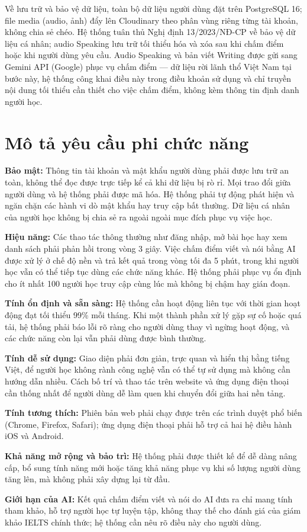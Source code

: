 \begin{sloppypar}
Về lưu trữ và bảo vệ dữ liệu, toàn bộ dữ liệu người dùng đặt trên PostgreSQL 16; file media (audio, ảnh) đẩy lên Cloudinary theo phân vùng riêng từng tài khoản, không chia sẻ chéo. Hệ thống tuân thủ Nghị định 13/2023/NĐ-CP về bảo vệ dữ liệu cá nhân; audio Speaking lưu trữ tối thiểu hóa và xóa sau khi chấm điểm hoặc khi người dùng yêu cầu. Audio Speaking và bản viết Writing được gửi sang Gemini API (Google) phục vụ chấm điểm --- dữ liệu rời lãnh thổ Việt Nam tại bước này, hệ thống công khai điều này trong điều khoản sử dụng và chỉ truyền nội dung tối thiểu cần thiết cho việc chấm điểm, không kèm thông tin định danh người học.
\end{sloppypar}

\section{Mô tả yêu cầu phi chức năng}

\textbf{Bảo mật:} Thông tin tài khoản và mật khẩu người dùng phải được lưu trữ an toàn, không thể đọc được trực tiếp kể cả khi dữ liệu bị rò rỉ. Mọi trao đổi giữa người dùng và hệ thống phải được mã hóa. Hệ thống phải tự động phát hiện và ngăn chặn các hành vi dò mật khẩu hay truy cập bất thường. Dữ liệu cá nhân của người học không bị chia sẻ ra ngoài ngoài mục đích phục vụ việc học.

\textbf{Hiệu năng:} Các thao tác thông thường như đăng nhập, mở bài học hay xem danh sách phải phản hồi trong vòng 3 giây. Việc chấm điểm viết và nói bằng AI được xử lý ở chế độ nền và trả kết quả trong vòng tối đa 5 phút, trong khi người học vẫn có thể tiếp tục dùng các chức năng khác. Hệ thống phải phục vụ ổn định cho ít nhất 100 người học truy cập cùng lúc mà không bị chậm hay gián đoạn.

\textbf{Tính ổn định và sẵn sàng:} Hệ thống cần hoạt động liên tục với thời gian hoạt động đạt tối thiểu 99\% mỗi tháng. Khi một thành phần xử lý gặp sự cố hoặc quá tải, hệ thống phải báo lỗi rõ ràng cho người dùng thay vì ngừng hoạt động, và các chức năng còn lại vẫn phải dùng được bình thường.

\textbf{Tính dễ sử dụng:} Giao diện phải đơn giản, trực quan và hiển thị bằng tiếng Việt, để người học không rành công nghệ vẫn có thể tự sử dụng mà không cần hướng dẫn nhiều. Cách bố trí và thao tác trên website và ứng dụng điện thoại cần thống nhất để người dùng dễ làm quen khi chuyển đổi giữa hai nền tảng.

\textbf{Tính tương thích:} Phiên bản web phải chạy được trên các trình duyệt phổ biến (Chrome, Firefox, Safari); ứng dụng điện thoại phải hỗ trợ cả hai hệ điều hành iOS và Android.

\textbf{Khả năng mở rộng và bảo trì:} Hệ thống phải được thiết kế để dễ dàng nâng cấp, bổ sung tính năng mới hoặc tăng khả năng phục vụ khi số lượng người dùng tăng lên, mà không phải xây dựng lại từ đầu.

\textbf{Giới hạn của AI:} Kết quả chấm điểm viết và nói do AI đưa ra chỉ mang tính tham khảo, hỗ trợ người học tự luyện tập, không thay thế cho đánh giá của giám khảo IELTS chính thức; hệ thống cần nêu rõ điều này cho người dùng.
